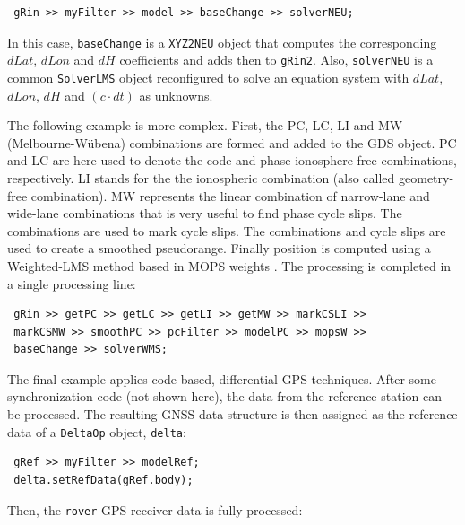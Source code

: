 \documentclass[letterpaper,ugly,10pt]{ion-gps}
\newcommand{\gpstkclass}[1]{\texttt{\mbox{#1}}}
\begin{document}
\begin{scriptsize}
\begin{lstlisting}
 gRin >> myFilter >> model >> baseChange >> solverNEU;
\end{lstlisting}
\end{scriptsize}

In this case, \gpstkclass{baseChange} is a \gpstkclass{XYZ2NEU} object that computes the corresponding $dLat$, $dLon$ and $dH$ coefficients and adds then to \gpstkclass{gRin2}. Also, \gpstkclass{solverNEU} is a common \gpstkclass{SolverLMS} object reconfigured to solve an equation system with $dLat$, $dLon$, $dH$ and $(c \cdot dt)$ as unknowns.

The following example is more complex. First, the PC, LC, LI and MW (Melbourne-W\"ubena) combinations are formed and added to the GDS object. PC and LC are here used to denote the code and phase ionosphere-free combinations, respectively. LI stands for the the ionospheric combination (also called geometry-free combination). MW represents the linear combination of narrow-lane and wide-lane combinations that is very useful to find phase cycle slips. The combinations are used to mark cycle slips. The combinations and cycle slips are used to create a smoothed pseudorange. Finally position is computed using a Weighted-LMS method based in MOPS weights \cite{mopsstandard}. The processing is completed in a single processing line:

\begin{scriptsize}
\begin{lstlisting}
 gRin >> getPC >> getLC >> getLI >> getMW >> markCSLI >>
 markCSMW >> smoothPC >> pcFilter >> modelPC >> mopsW >>
 baseChange >> solverWMS;
\end{lstlisting}
\end{scriptsize}

The final example applies code-based, differential GPS techniques. After some synchronization code (not shown here), the data from the reference station can be processed. The resulting GNSS data structure is then assigned as the reference data of a \gpstkclass{DeltaOp} object, \gpstkclass{delta}:

\begin{scriptsize}
\begin{lstlisting}
 gRef >> myFilter >> modelRef;
 delta.setRefData(gRef.body);
\end{lstlisting}
\end{scriptsize}

Then, the \gpstkclass{rover} GPS receiver data is fully processed:
\end{document}
